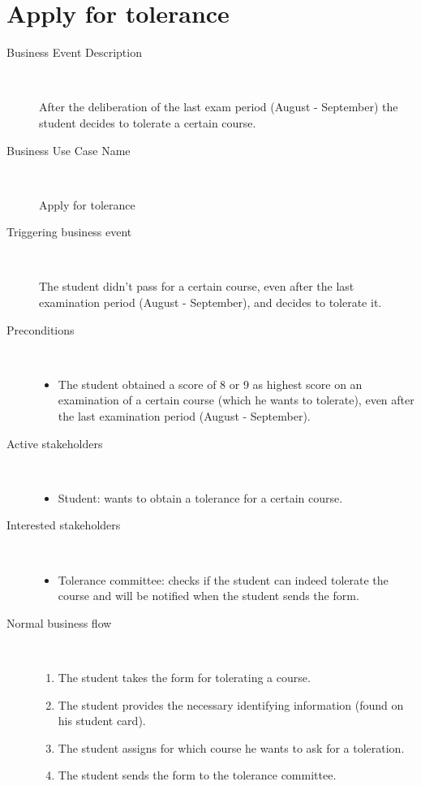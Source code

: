 \section{Apply for tolerance}

\begin{description}
	\item[Business Event Description] \ 
		\par After the deliberation of the last exam period (August - September) the
		student decides to tolerate a certain course. %
	\item[Business Use Case Name] \ 
		\par Apply for tolerance
	\item[Triggering business event] \ 
		\par The student didn't pass for a certain course, even after the last
		examination period (August - September), and decides to tolerate it.
	\item[Preconditions] \
	\begin{itemize}
		\item The student obtained a score of 8 or 9 as highest score on an
		examination of a certain course (which he wants to tolerate), even after the
		last examination period (August - September).
	\end{itemize}
	\item[Active stakeholders] \ 
	\begin{itemize}
		\item Student: wants to obtain a tolerance for a certain course.
	\end{itemize}
	\item[Interested stakeholders] \ 
		\begin{itemize}
		\item Tolerance committee: checks if the student can indeed tolerate the
		course and will be notified when the student sends the form.
		\end{itemize}
	\item[Normal business flow] \ 
	\begin{enumerate}
	  	\item The student takes the form for tolerating a course.
	  	\item The student provides the necessary identifying information (found on
	  	his student card).
	  	\item The student assigns for which course he wants to ask for a toleration.
	  	\item The student sends the form to the tolerance committee.

\end{enumerate}
\end{description}
